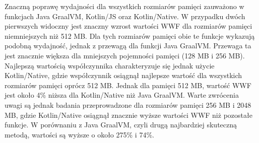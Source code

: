 Znaczną poprawę wydajności dla wszystkich rozmiarów pamięci zauważono w funkcjach Java GraalVM, Kotlin/JS oraz Kotlin/Native.
W przypadku dwóch pierwszych widoczny jest znaczny wzrost wartości WWF dla rozmiarów pamięci niemniejszych niż 512 MB.
Dla tych rozmiarów pamięci obie te funkcje wykazują podobną wydajność, jednak z przewagą dla funkcji Java GraalVM.
Przewaga ta jest znacznie większa dla mniejszych pojemności pamięci (128 MB i 256 MB).
Najlepszą wartością współczynnika charakteryzuje się jednak użycie Kotlin/Native, gdzie współczynnik osiągnął najlepsze wartość dla wszystkich rozmiarów pamięci oprócz 512 MB.
Jednak dla pamięci 512 MB, wartość WWF jest około 4\% niższa dla Kotlin/Native niż Java GraalVM.
Warte zwrócenia uwagi są jednak badania przeprowadzone dla rozmiarów pamięci 256 MB i 2048 MB, gdzie Kotlin/Native osiągnął znacznie wyższe wartości WWF niż pozostałe funkcje.
W porównaniu z Java GraalVM, czyli drugą najbardziej skuteczną metodą, wartości są wyższe o około 275\% i 74\%.
